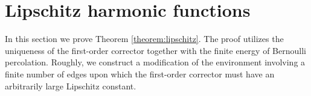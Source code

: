 \documentclass[12pt]{amsart}
\numberwithin{equation}{section}
\begin{document}

	
	
	
	\section{Lipschitz harmonic functions} \label{sec:lipschitz}
	In this section we prove Theorem \ref{theorem:lipschitz}. The proof utilizes the uniqueness of the first-order corrector 
	together with the finite energy of Bernoulli percolation. Roughly, we construct a modification of the environment involving a finite number of edges
	upon which the first-order corrector must have an arbitrarily large Lipschitz constant. 
	
\end{document}
